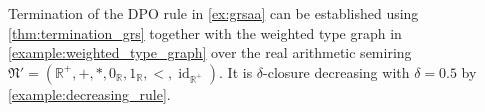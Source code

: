 \begin{example}
    \label{example:termination}
    Termination of the DPO rule in \autoref{ex:grsaa} can be established using \autoref{thm:termination_grs} together with the weighted type graph in \autoref{example:weighted_type_graph} over the real arithmetic semiring $\mathfrak{N}' = (\mathbb{R}^+,+,*,0_\mathbb{R},1_\mathbb{R},<,\operatorname{id}_{\mathbb{R}^+})$. It is $\delta$-closure decreasing with $\delta = 0.5$ by \autoref{example:decreasing_rule}.
\end{example}